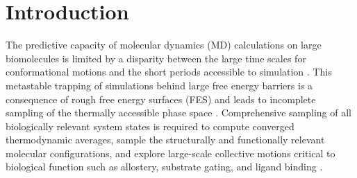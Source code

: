 \documentclass[12pt]{article}
\newcommand*{\groen}[1]{#1}
\begin{document}
  \makeatletter
  \renewcommand\@biblabel[1]{#1.}
  \makeatother



\renewcommand{\baselinestretch}{1.5}
\normalsize


\clearpage



\section{\sffamily \Large Introduction} \label{sec:intro}

The predictive capacity of molecular dynamics (\groen{MD}) calculations on large biomolecules is limited by a disparity between the large time scales for conformational motions and the short periods accessible to simulation \cite{hashemian2013modeling,bernardi2015enhanced,karplus1990molecular}. This metastable trapping of simulations behind large free energy barriers is a consequence of rough free energy surfaces (\groen{FES}) and leads to incomplete sampling of the thermally accessible phase space \cite{hashemian2013modeling,bernardi2015enhanced,rohrdanz2013discovering,abrams2013enhanced}. Comprehensive sampling of all biologically relevant system states is required to compute converged thermodynamic averages, sample the structurally and functionally relevant molecular configurations, and explore large-scale collective motions critical to biological function such as allostery, substrate gating, and ligand binding \cite{hashemian2013modeling,bernardi2015enhanced,karplus1990molecular}. 

\end{document}
